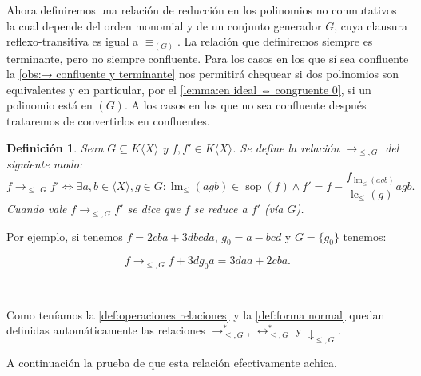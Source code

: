 \documentclass[12pt]{report}
\theoremstyle{customstyle}
\newtheorem{definition}[theorem]{Definición}
\theoremstyle{factstyle}
\DeclareMathOperator{\sop}{sop}
\DeclareMathOperator{\lm}{lm}
\DeclareMathOperator{\lc}{lc}
\begin{document}
Ahora definiremos una relación de reducción en los polinomios no conmutativos la cual depende del orden monomial y de un conjunto generador $G$, cuya clausura reflexo-transitiva es igual a $≡_{(G)}$. La relación que definiremos siempre es terminante, pero no siempre confluente. Para los casos en los que sí sea confluente la \cref{obs:→ confluente y terminante} nos permitirá chequear si dos polinomios son equivalentes y en particular, por el \cref{lemma:en ideal ⇔ congruente 0}, si un polinomio está en $(G)$. A los casos en los que no sea confluente después trataremos de convertirlos en confluentes.

\begin{definition}\label{def:reducciones}
  Sean $G ⊆ K⟨X⟩$ y $f, f' ∈ K⟨X⟩$. Se define la relación $→_{≤, G}$ del siguiente modo:
  \[ f →_{≤, G} f' ⇔ ∃a, b ∈ ⟨X⟩, g ∈ G : \lm_≤(agb) ∈ \sop(f) ∧ f' = f - \frac{f_{\lm_≤(agb)}}{\lc_≤(g)}agb \text{.} \]
  Cuando vale $f →_{≤, G}f'$ se dice que $f$ se reduce a $f'$ (vía $G$).
\end{definition}

Por ejemplo, si tenemos $f = 2 cba + 3 dbcda$, $g_0 = a - bcd$ y $G = \{g_0\}$ tenemos:

\[f →_{≤, G} f + 3d g_0 a = 3 daa + 2 cba \text{.}\]

\

Como teníamos la \cref{def:operaciones relaciones} y la \cref{def:forma normal} quedan definidas automáticamente las relaciones $→^*_{≤, G}$, $↔^*_{≤, G}$ y $↓_{≤, G}$.

A continuación la prueba de que esta relación efectivamente achica.
\end{document}
